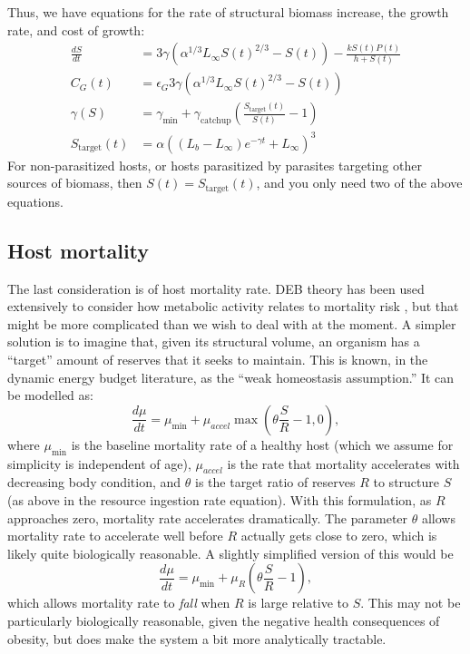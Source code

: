 \documentclass[12pt,reqno,final,pdftex]{amsart}\usepackage[]{graphicx}\usepackage[]{color}
\theoremstyle{plain}
\numberwithin{equation}{part}
\begin{document}
Thus, we have equations for the rate of structural biomass increase, the growth rate, and cost of growth:
\begin{align}
\frac{dS}{dt} &= 3\gamma  \left(\alpha^{1/3}L_{\infty }S(t)^{2/3}-S(t)\right)-\frac{k S(t) P(t)}{h+S(t)} \\
C_G(t)&=\epsilon_G 3\gamma \left(\alpha^{1/3}L_{\infty }S(t)^{2/3}-S(t)\right) \\
\gamma(S) &=\gamma_{\min}+\gamma_{\text{catchup}}\left(\frac{S_{\text{target}}(t)}{S(t)}-1\right) \\
S_{\text{target}}(t) &=\alpha \left(\left(L_b-L_{\infty }\right) e^{-\gamma  t}+L_{\infty }\right)^3
\end{align}
For non-parasitized hosts, or hosts parasitized by parasites targeting other sources of biomass, then $S(t)=S_{\text{target}}(t)$, and you only need two of the above equations.

\subsection*{Host mortality}
The last consideration is of host mortality rate.
DEB theory has been used extensively to consider how metabolic activity relates to mortality risk \citep[by keeping track of things like oxidative damage, e.g.,][]{vanLeeuwen2002,Kooijman2009}, but that might be more complicated than we wish to deal with at the moment.
A simpler solution is to imagine that, given its structural volume, an organism has a ``target'' amount of reserves that it seeks to maintain.
This is known, in the dynamic energy budget literature, as the ``weak homeostasis assumption.''
It can be modelled as:
\begin{equation}
\frac{d\mu}{dt} = \mu_{\min} + \mu_{accel}\max\left(\theta \frac{S}{R} - 1, 0\right),
\end{equation}
where $\mu_{\min}$ is the baseline mortality rate of a healthy host (which we assume for simplicity is independent of age), $\mu_{accel}$ is the rate that mortality accelerates with decreasing body condition, and $\theta$ is the target ratio of reserves $R$ to structure $S$ (as above in the resource ingestion rate equation).
With this formulation, as $R$ approaches zero, mortality rate accelerates dramatically.
The parameter $\theta$ allows mortality rate to accelerate well before $R$ actually gets close to zero, which is likely quite biologically reasonable.
A slightly simplified version of this would be
\begin{equation}
\frac{d\mu}{dt} = \mu_{\min} + \mu_{R}\left(\theta \frac{S}{R} - 1\right),
\end{equation}
which allows mortality rate to \emph{fall} when $R$ is large relative to $S$.
This may not be particularly biologically reasonable, given the negative health consequences of obesity, but does make the system a bit more analytically tractable.
\end{document}
